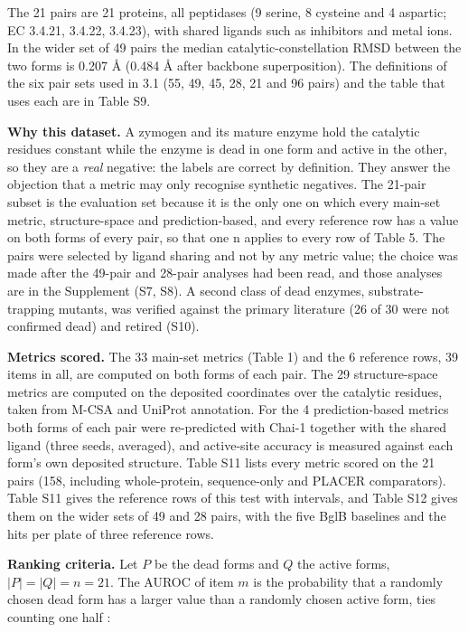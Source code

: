 \documentclass[
  10pt,
]{article}
\DeclareRobustCommand{\_}{\textunderscore\hspace{0pt}}
\begin{document}
The 21 pairs are 21
proteins, all
peptidases (9
serine, 8 cysteine
and 4 aspartic; EC
3.4.21, 3.4.22,
3.4.23), with shared
ligands such as
inhibitors and metal
ions. In the wider
set of 49 pairs the
median
catalytic-constellation
RMSD between the two
forms is 0.207 Å
(0.484 Å after
backbone
superposition). The
definitions of the
six pair sets used
in 3.1 (55, 49, 45,
28, 21 and 96 pairs)
and the table that
uses each are in
Table S9.

\textbf{Why this
dataset.} A zymogen
and its mature
enzyme hold the
catalytic residues
constant while the
enzyme is dead in
one form and active
in the other, so
they are a
\emph{real}
negative: the labels
are correct by
definition. They
answer the objection
that a metric may
only recognise
synthetic negatives.
The 21-pair subset
is the evaluation
set because it is
the only one on
which every main-set
metric,
structure-space and
prediction-based,
and every reference
row has a value on
both forms of every
pair, so that one n
applies to every row
of Table 5. The
pairs were selected
by ligand sharing
and not by any
metric value; the
choice was made
after the 49-pair
and 28-pair analyses
had been read, and
those analyses are
in the Supplement
(S7, S8). A second
class of dead
enzymes,
substrate-trapping
mutants, was
verified against the
primary literature
(26 of 30 were not
confirmed dead) and
retired (S10).

\textbf{Metrics
scored.} The 33
main-set metrics
(Table 1) and the 6
reference rows, 39
items in all, are
computed on both
forms of each pair.
The 29
structure-space
metrics are computed
on the deposited
coordinates over the
catalytic residues,
taken from M-CSA
\cite{ribeiro2018}
and UniProt
\cite{uniprot2023}
annotation. For the
4 prediction-based
metrics both forms
of each pair were
re-predicted with
Chai-1 together with
the shared ligand
(three seeds,
averaged), and
active-site accuracy
is measured against
each form's own
deposited structure.
Table S11 lists
every metric scored
on the 21 pairs
(158, including
whole-protein,
sequence-only and
PLACER
\cite{anishchenko2025}
comparators). Table
S11 gives the
reference rows of
this test with
intervals, and Table
S12 gives them on
the wider sets of 49
and 28 pairs, with
the five BglB
baselines and the
hits per plate of
three reference
rows.

\textbf{Ranking
criteria.} Let \(P\)
be the dead forms
and \(Q\) the active
forms,
\(|P| = |Q| = n = 21\).
The AUROC of item
\(m\) is the
probability that a
randomly chosen dead
form has a larger
value than a
randomly chosen
active form, ties
counting one half
\cite{hanley1982}:
\end{document}
